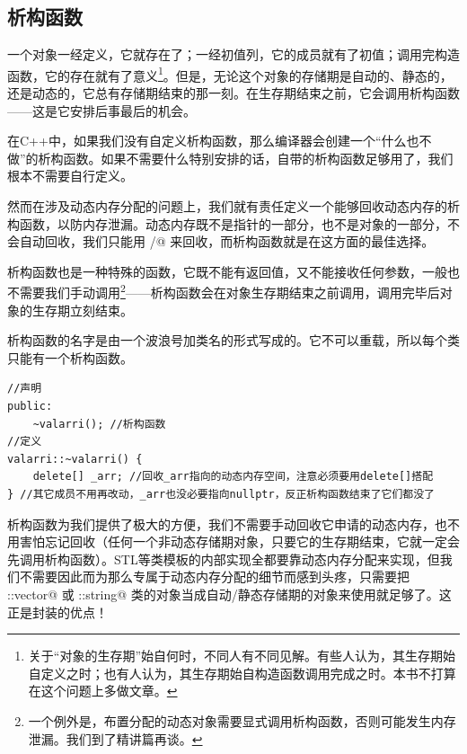 \subsection*{析构函数}
一个对象一经定义，它就存在了；一经初值列，它的成员就有了初值；调用完构造函数，它的存在就有了意义\footnote{关于``对象的生存期''始自何时，不同人有不同见解。有些人认为，其生存期始自定义之时；也有人认为，其生存期始自构造函数调用完成之时。本书不打算在这个问题上多做文章。}。但是，无论这个对象的存储期是自动的、静态的，还是动态的，它总有存储期结束的那一刻。在生存期结束之前，它会调用析构函数——这是它安排后事最后的机会。\par
在C++中，如果我们没有自定义析构函数，那么编译器会创建一个``什么也不做''的析构函数。如果不需要什么特别安排的话，自带的析构函数足够用了，我们根本不需要自行定义。\par
然而在涉及动态内存分配的问题上，我们就有责任定义一个能够回收动态内存的析构函数，以防内存泄漏。动态内存既不是指针的一部分，也不是对象的一部分，不会自动回收，我们只能用 \lstinline@delete@/\lstinline@delete[]@ 来回收，而析构函数就是在这方面的最佳选择。\par
析构函数也是一种特殊的函数，它既不能有返回值，又不能接收任何参数，一般也不需要我们手动调用\footnote{一个例外是，布置分配的动态对象需要显式调用析构函数，否则可能发生内存泄漏。我们到了精讲篇再谈。}——析构函数会在对象生存期结束之前调用，调用完毕后对象的生存期立刻结束。\par
析构函数的名字是由一个波浪号加类名的形式写成的。它不可以重载，所以每个类只能有一个析构函数。
\begin{lstlisting}
//声明
public:
    ~valarri(); //析构函数
//定义
valarri::~valarri() {
    delete[] _arr; //回收_arr指向的动态内存空间，注意必须要用delete[]搭配
} //其它成员不用再改动，_arr也没必要指向nullptr，反正析构函数结束了它们都没了
\end{lstlisting}\par
析构函数为我们提供了极大的方便，我们不需要手动回收它申请的动态内存，也不用害怕忘记回收（任何一个非动态存储期对象，只要它的生存期结束，它就一定会先调用析构函数）。STL等类模板的内部实现全都要靠动态内存分配来实现，但我们不需要因此而为那么专属于动态内存分配的细节而感到头疼，只需要把 \lstinline@std::vector@ 或 \lstinline@std::string@ 类的对象当成自动/静态存储期的对象来使用就足够了。这正是封装的优点！\par
